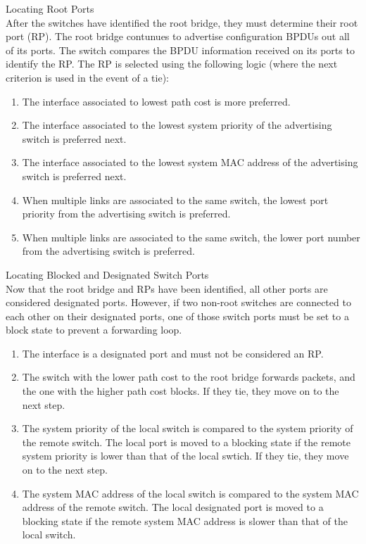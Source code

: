 \documentclass{article}
\begin{document}
\noindent Locating Root Ports\\
	\indent After the switches have identified the root bridge, they must determine their root port (RP). The root bridge contunues to advertise configuration BPDUs out all of its ports. The switch compares the BPDU information received on its ports to identify the RP. The RP is selected using the following logic (where the next criterion is used in the event of a tie):
\begin{enumerate}[label = \arabic*.]
\item The interface associated to lowest path cost is more preferred.
\item The interface associated to the lowest system priority of the advertising switch is preferred next.
\item The interface associated to the lowest system MAC address of the advertising switch is preferred next.
\item When multiple links are associated to the same switch, the lowest port priority from the advertising switch is preferred.
\item When multiple links are associated to the same switch, the lower port number from the advertising switch is preferred.
\end{enumerate}

\noindent Locating Blocked and Designated Switch Ports\\
	\indent Now that the root bridge and RPs have been identified, all other ports are considered designated ports. However, if two non-root switches are connected to each other on their designated ports, one of those switch ports must be set to a block state to prevent a forwarding loop.
\begin{enumerate}[label = \arabic*.]
\item The interface is a designated port and must not be considered an RP.
\item The switch with the lower path cost to the root bridge forwards packets, and the one with the higher path cost blocks. If they tie, they move on to the next step.
\item The system priority of the local switch is compared to the system priority of the remote switch. The local port is moved to a blocking state if the remote system priority is lower than that of the local swtich. If they tie, they move on to the next step.
\item The system MAC address of the local switch is compared to the system MAC address of the remote switch. The local designated port is moved to a blocking state if the remote system MAC address is slower than that of the local switch. 
\end{enumerate}
\end{document}

